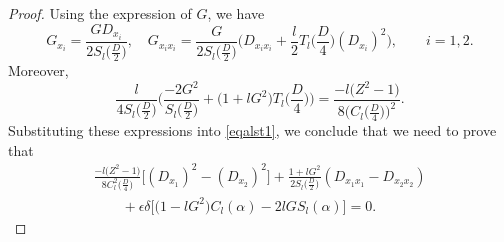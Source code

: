 \documentclass[pdftex]{sigma}
\numberwithin{equation}{section}
\begin{document}
\begin{proof}
Using the expression of $G$, we have
\[
G_{x_i}=\frac{G D_{x_i}}{2S_l\bigl(\frac{D}{2}\bigr)},
\quad
G_{x_ix_i}=\frac{G}{2S_l\bigl(\frac{D}{2}\bigr)}\biggl( D_{x_ix_i}+\frac{l}{2}T_l\biggl(\frac{D}{4}\biggr) (D_{x_i})^2 \biggr), \qquad i=1,2.
\]
Moreover,
\[
\frac{l}{4S_l\bigl(\frac{D}{2}\bigr)}\biggl(\frac{-2G^2}{S_l\bigl(\frac{D}{2}\bigr)}+\bigl(1+l G^2\bigr)
T_l\biggl(\frac{D}{4}\biggr)\biggr)= \frac{-l\bigl(Z^2-1\bigr)}{8\bigl(C_l\bigl(\frac{D}{4}\bigr)\bigr)^2}.
\]
Substituting these expressions into \eqref{eqalst1}, we conclude that we need to prove that
\begin{gather}
\frac{-l\bigl(Z^2-1\bigr)}{8C_l^2\bigl(\frac{D}{4}\bigr)} \bigl[(D_{x_1})^2-(D_{x_2})^2\bigr]+
\frac{1+l G^2}{2S_l\bigl(\frac{D}{2}\bigr)}(D_{x_1x_1}-D_{x_2x_2})\nonumber\\
\qquad{}+\epsilon\delta \bigl[ \bigl(1-l G^2\bigr)C_l(\alpha)-2l G S_l(\alpha)\bigr]=0.\label{eqalst3}
\end{gather}


\end{proof}
\end{document}
